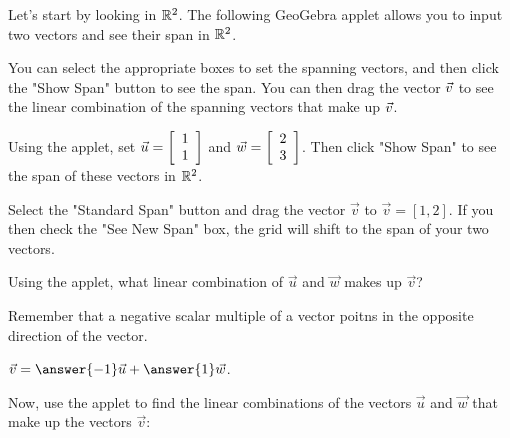 \documentclass{ximera}
\begin{document}
\begin{exploration}

Let's start by looking in $\R^2$. The following GeoGebra applet allows you to input two vectors and see their span in $\R^2$. 

You can select the appropriate boxes to set the spanning vectors, and then click the "Show Span" button to see the span. You can then drag the vector $\vect{v}$ to see the linear combination of the spanning vectors that make up $\vect{v}$.

\begin{example}

  Using the applet, set $\vect{u}=\startmat{r} 1 \\ 1 \stopmat$ and $\vec{w}=\startmat{r} 2 \\ 3 \stopmat$. Then click "Show Span" to see the span of these vectors in $\R^2$.

  \begin{center}
  \end{center}

  Select the "Standard Span" button and drag the vector $\vec{v}$ to $\vec{v}=[1,2]$. If you then check the "See New Span" box, the grid will shift to the span of your two vectors. 
  
  Using the applet, what linear combination of $\vec{u}$ and $\vec{w}$ makes up $\vec{v}$?

  \begin{hint}
  
    Remember that a negative scalar multiple of a vector poitns in the opposite direction of the vector.

  \end{hint}

  \begin{solution}
  
    $\vec{v}=\answer{-1}\vec{u}+\answer{1}\vec{w}$.

  \end{solution}

\end{example}

\begin{example}

  Now, use the applet to find the linear combinations of the vectors $\vec{u}$ and $\vec{w}$ that make up the vectors $\vec{v}$:

  \begin{enumerate}
  

\end{enumerate}
\end{example}
\end{exploration}
\end{document}
